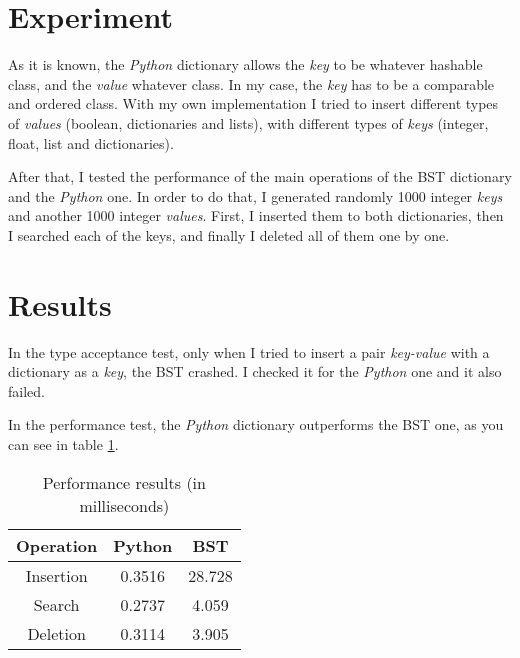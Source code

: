 \documentclass[a4paper, 10pt]{article}
\begin{document}
\section*{Experiment}
As it is known, the \textit{Python} dictionary allows the \textit{key} to be whatever hashable class, and the \textit{value} whatever class. In my case, the \textit{key} has to be a comparable and ordered class. With my own implementation I tried to insert different types of \textit{values} (boolean, dictionaries and lists), with different types of \textit{keys} (integer, float, list and dictionaries).

After that, I tested the performance of the main operations of the BST dictionary and the \textit{Python} one. In order to do that, I generated randomly 1000 integer \textit{keys} and another 1000 integer \textit{values}. First, I inserted them to both dictionaries, then I searched each of the keys, and finally I deleted all of them one by one.


\section*{Results}
In the type acceptance test, only when I tried to insert a pair \textit{key-value} with a dictionary as a \textit{key}, the BST crashed. I checked it for the \textit{Python} one and it also failed.

In the performance test, the \textit{Python} dictionary outperforms the BST one, as you can see in table \ref{tab}.

\begin{table}[hbtp]
	\centering
	\begin{tabular}{c c c}
		\textbf{Operation} & \textbf{Python} & \textbf{BST} \\ \hline
		Insertion & 0.3516 & 28.728 \\
		Search & 0.2737 & 4.059 \\
		Deletion & 0.3114 & 3.905 	\\		
	\end{tabular}
	\caption{Performance results (in milliseconds)}
	\label{tab}
\end{table}



\end{document}
